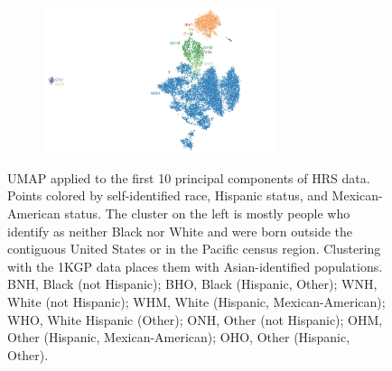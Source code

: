 \documentclass[12pt]{pnas-new}
\begin{document}
\begin{figure}
    \centering
    \begin{subfigure}{0.95\textwidth}
    \includegraphics[width=0.75\textwidth]{images/HRS_1000G_NP1_UMAP_PC10_NC2_NN15_MD05_pca_1kgp_onto_hrs_umap_1kgp_onto_hrs_2018112221116_race_hisp_mex_labels.pdf}
    \end{subfigure}
    \caption{UMAP applied to the first 10 principal components of HRS data. Points colored by self-identified race, Hispanic status, and Mexican-American status. The cluster on the left is mostly people who identify as neither Black nor White and were born outside the contiguous United States or in the Pacific census region. Clustering with the 1KGP data places them with Asian-identified populations. BNH, Black (not Hispanic); BHO, Black (Hispanic, Other); WNH, White (not Hispanic); WHM, White (Hispanic, Mexican-American); WHO, White Hispanic (Other); ONH, Other (not Hispanic); OHM, Other (Hispanic, Mexican-American); OHO, Other (Hispanic, Other).}
    \label{fig:supp_umap_hrs_eth}
\end{figure}

\end{document}
